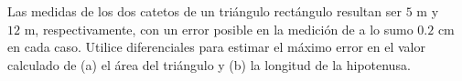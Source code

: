 \item Las medidas de los dos catetos de un triángulo rectángulo resultan ser $5\text{ m}$ y $12\text{ m}$, respectivamente, con un error posible en la medición de a lo sumo $0.2\text{ cm}$ en cada caso. Utilice diferenciales para estimar el máximo error en el valor calculado de (a) el área del triángulo y (b) la longitud de la hipotenusa.
